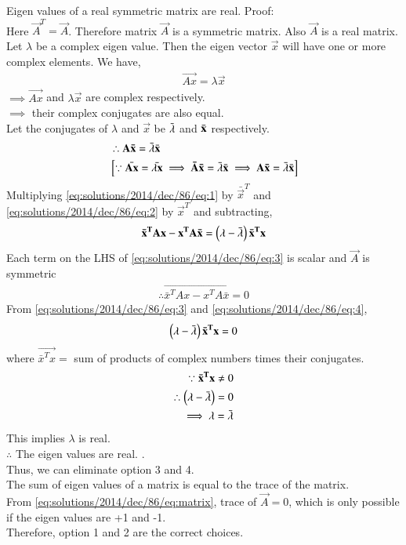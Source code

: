 {Eigen values of a real symmetric matrix are real.}
Proof: \\
Here $\vec A^T=\vec A$. Therefore matrix $\vec A$ is a symmetric matrix. Also $\vec A$ is a real matrix.\\
Let $\lambda$ be a complex eigen value. Then the eigen vector $\vec x$ will have one or more complex elements.
We have,
\begin{align}
    \vec {Ax} =\lambda\vec x \label{eq:solutions/2014/dec/86/eq:1}
\end{align}
$\implies \vec {Ax}$ and $\lambda \vec x $ are complex respectively.\\
$\implies$ their complex conjugates are also equal.\\
Let the conjugates of $\lambda$ and $\vec x $ be $\Bar{\lambda}$ and $\Bar{\vec x}$ respectively.
\begin{align}
    &\therefore \vec{A\Bar{x}}=\Bar{\lambda}\bar{\vec x}\label{eq:solutions/2014/dec/86/eq:2}\\
    &\sbrak{\because \bar{\vec{Ax}}= \Bar{\lambda \vec{x}}
    \implies \vec{\Bar{A}\bar{x}} = \bar{ \lambda}\bar{\vec x}
    \implies \vec {A\Bar{x}}= \Bar{\lambda}\bar{\vec x}}
\end{align}
Multiplying \eqref{eq:solutions/2014/dec/86/eq:1} by $\bar{\vec x}^T$ and \eqref{eq:solutions/2014/dec/86/eq:2} by $\vec x^T$ and subtracting,
\begin{align}
    \vec{\bar{x}^TAx}-\vec{x^TA\bar{x}}=\brak{\lambda-\bar{\lambda}}\vec{\bar{x}^Tx}\label{eq:solutions/2014/dec/86/eq:3}
\end{align}
Each term on the LHS of \eqref{eq:solutions/2014/dec/86/eq:3} is scalar and $\vec A$ is symmetric
\begin{align}
    \therefore \vec{\bar{x}^TAx - x^TA\bar{x}} =0\label{eq:solutions/2014/dec/86/eq:4}
\end{align}
From \eqref{eq:solutions/2014/dec/86/eq:3} and \eqref{eq:solutions/2014/dec/86/eq:4}, 
\begin{align}
    \brak{\lambda- \bar{\lambda}}\vec{\bar{x}^Tx} =0
\end{align}
where $\vec{\bar{x}^Tx} = $ sum of products of complex numbers times their conjugates.
\begin{align}
    \because \vec{\bar{x}^Tx} \neq 0\\
    \therefore \brak{ \lambda-\bar{\lambda}}= 0\\
    \implies \lambda= \bar{\lambda}
\end{align}
This implies $\lambda$ is real.\\
$\therefore$ The eigen values are real. .\\
Thus, we can eliminate option 3 and 4.\\
The sum of eigen values of a matrix is equal to the trace of the matrix.\\
From \eqref{eq:solutions/2014/dec/86/eq:matrix}, trace of $\vec A = 0$, which is only possible if the eigen values are +1 and -1.\\
Therefore, option 1 and 2 are the correct choices.

